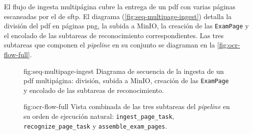 El flujo de ingesta multipágina cubre la entrega de un pdf con
varias páginas escaneadas por el  de \acs{sftp}. El
diagrama (\cref{fig:seq-multipage-ingest}) detalla la división del
pdf en páginas png, la subida a MinIO, la creación de las
\texttt{ExamPage} y el encolado de las subtareas de reconocimiento
correspondientes. Las tres subtareas que componen el \textit{pipeline}
en su conjunto se diagraman en la \cref{fig:ocr-flow-full}.

\begin{figure}[Flujo de ingesta multipágina]%
              {fig:seq-multipage-ingest}%
              {Diagrama de secuencia de la ingesta de un \acs{pdf}
               multipágina: división, subida a MinIO, creación de las
               \texttt{ExamPage} y encolado de las subtareas de
               reconocimiento.}
\end{figure}

\begin{figure}[Pipeline completo de ingesta y reconocimiento]%
              {fig:ocr-flow-full}%
              {Vista combinada de las tres subtareas del
               \textit{pipeline} en su orden de ejecución natural:
               \texttt{ingest\_page\_task}, \texttt{recognize\_page\_task}
               y \texttt{assemble\_exam\_pages}.}
\end{figure}
